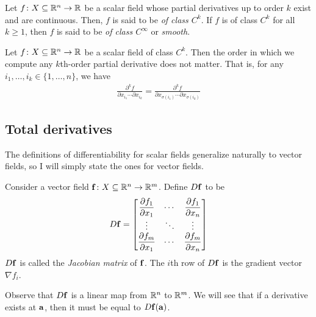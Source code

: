 \documentclass{article}
\begin{document}
\begin{definition}
  Let $f \colon X \subseteq \mathbb{R}^n \to \mathbb{R}$ be a scalar field whose partial derivatives up to order $k$ exist and are continuous.
  Then, $f$ is said to be \emph{of class $C^k$}.
  If $f$ is of class $C^k$ for all $k \geq 1$, then $f$ is said to be \emph{of class $C^\infty$} or \emph{smooth}.
\end{definition}

\begin{theorem}
  Let $f \colon X \subseteq \mathbb{R}^n \to \mathbb{R}$ be a scalar field of class $C^k$.
  Then the order in which we compute any $k$th-order partial derivative does not matter.
  That is, for any $i_1, \ldots, i_k \in \{ 1, \ldots, n \}$, we have
  \begin{align}
    \frac{\partial^k f}{\partial x_{i_1} \cdots \partial x_{i_k}} = \frac{\partial^k f}{\partial x_{\sigma(i_1)} \cdots \partial x_{\sigma(i_k)}}
  \end{align}
\end{theorem}

\subsection{Total derivatives}

The definitions of differentiability for scalar fields generalize naturally to vector fields, so I will simply state the ones for vector fields.

\begin{definition}
  Consider a vector field $\mathbf{f} \colon X \subseteq \mathbb{R}^n \to \mathbb{R}^m$.
  Define $D\mathbf{f}$ to be
  \begin{align}
    D\mathbf{f} = \begin{bmatrix}
                  \dfrac{\partial f_1}{\partial x_1} & \cdots & \dfrac{\partial f_1}{\partial x_n}
                  \\
                  \vdots                             & \ddots & \vdots
                  \\
                  \dfrac{\partial f_m}{\partial x_1} & \cdots & \dfrac{\partial f_m}{\partial x_n}
                \end{bmatrix}
  \end{align}
  $D\mathbf{f}$ is called the \emph{Jacobian matrix} of $\mathbf{f}$.
  The $i$th row of $D\mathbf{f}$ is the gradient vector $\nabla f_i$.
\end{definition}
Observe that $D\mathbf{f}$ is a linear map from $\mathbb{R}^n$ to $\mathbb{R}^m$.
We will see that if a derivative exists at $\mathbf{a}$, then it must be equal to $D\mathbf{f}(\mathbf{a})$.
\end{document}
